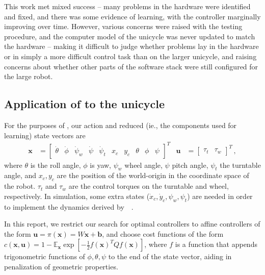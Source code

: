 \documentclass[main.tex]{subfiles}
\begin{document}
	This work met mixed success -- many problems in the hardware were identified and fixed, and there was some evidence of learning, with the controller marginally improving over time.
	However, various concerns were raised with the testing procedure, and the computer model of the unicycle was never updated to match the hardware -- making it difficult to judge whether problems lay in the hardware or in simply a more difficult control task than on the larger unicycle, and raising concerns about whether other parts of the software stack were still configured for the large robot.

	\subsection{Application of {\Pilco} to the unicycle}
		For the purposes of {\Pilco}, our action and reduced (ie., the components used for learning) state vectors are
		\begin{align}
			\bm{x} &= \begin{bmatrix}
				\dot\theta & \dot\phi &\dot\psi_w & \dot\psi & \dot\psi_t &
				x_c & y_c &
				\theta &
				\phi & \psi
			\end{bmatrix}^T &
			\bm{u} &= \begin{bmatrix}
				\tau_t & \tau_w
			\end{bmatrix}^T\,, \label{eq:state-vars}
		\end{align}
		where $\theta$ is the roll angle, $\phi$ is yaw, $\psi_w$ wheel angle,
		$\psi$ pitch angle, $\psi_t$ the turntable angle, and $x_c, y_c$ are the position of the world-origin in the coordinate space of the robot.
		$\tau_t$ and $\tau_w$ are the control torques on the turntable and wheel, respectively.
		In simulation, some extra states ($\dot{x}_c, \dot{y}_c, \psi_w, \psi_t$) are needed in order to implement the dynamics derived by~\citeauthor{forster}~\cite{forster}.

		In this report, we restrict our search for optimal controllers to affine controllers of the form
		$\bm{u} = \pi(\bm{x}) = W\bm{x} + \bm{b}$, and choose cost functions of the form
		$c(\bm{x}, \bm{u}) = 1 - \mathbb{E}_{\bm{x}} \exp\left[-\frac{1}{2} f(\bm{x})^T Q f(\bm{x})\right]$, where $f$ is a function that appends trigonometric functions of $\phi, \theta, \psi$ to the end of the state vector, aiding in penalization of geometric properties.
\end{document}
